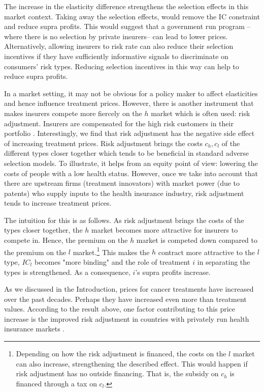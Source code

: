 \documentclass[12pt,english,a4paper]{article}
\begin{document}
The increase in the elasticity difference strengthens the selection effects in this market context. Taking away the selection effects, would remove the IC constraint and reduce supra profits. This would suggest that a government run program --where there is no selection by private insurers-- can lead to lower prices. Alternatively, allowing insurers to risk rate can also reduce their selection incentives if they have sufficiently informative signals to discriminate on consumers' risk types. Reducing selection incentives in this way can help to reduce supra profits.

In a market setting, it may not be obvious for a policy maker to affect elasticities and hence influence treatment prices. However, there is another instrument that makes insurers compete more fiercely on the \(h\) market which is often used: risk adjustment. Insurers are compensated for the high risk customers in their portfolio \citep{vandevenellis2000}. Interestingly, we find that risk adjustment has the negative side effect of increasing treatment prices. Risk adjustment brings the costs \(c_h,c_l\) of the different types closer together which tends to be beneficial in standard adverse selection models. To illustrate, it helps from an equity point of view: lowering the costs of people with a low health status. However, once we take into account that there are upstream firms (treatment innovators) with market power (due to patents) who supply inputs to the health insurance industry, risk adjustment tends to increase treatment prices.

The intuition for this is as follows. As risk adjustment brings the costs of the types closer together, the \(h\) market becomes more attractive for insurers to compete in. Hence, the premium on the \(h\) market is competed down compared to the premium on the \(l\) market.\footnote{Depending on how the risk adjustment is financed, the costs on the \(l\) market can also increase, strengthening the described effect. This would happen if risk adjustment has no outside financing. That is, the subsidy on \(c_h\) is financed through a tax on \(c_l\).} This makes the \(h\) contract more attractive to the \(l\) type, \(IC_l\) becomes "more binding" and the role of treatment \(i\) in separating the types is strengthened. As a consequence, \(i\)'s supra profits increase.

As we discussed in the Introduction, prices for cancer treatments have increased over the past decades. Perhaps they have increased even more than treatment values. According to the result above, one factor contributing to this price increase is the improved risk adjustment in countries with privately run health insurance markets \citep{Schut2011o}.
\end{document}

